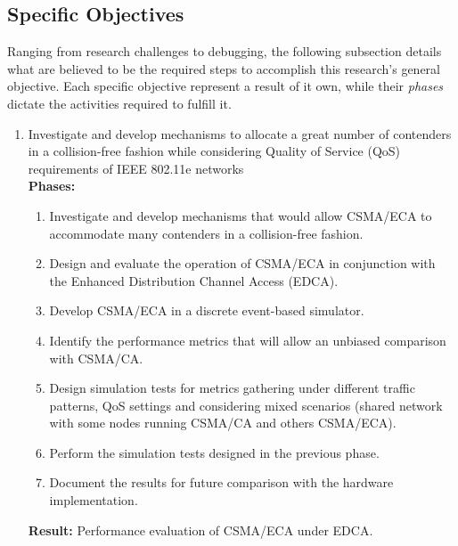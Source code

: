 \subsection{Specific Objectives}
Ranging from research challenges to debugging, the following subsection details what are believed to be the required steps to accomplish this research's general objective. Each specific objective represent a result of it own, while their \emph{phases} dictate the activities required to fulfill it.
\begin{enumerate}

	\item Investigate and develop mechanisms to allocate a great number of contenders in a collision-free fashion while considering Quality of Service (QoS) requirements of IEEE 802.11e networks\\
	
	{\bfseries Phases:}
	\begin{enumerate}
		\item Investigate and develop mechanisms that would allow CSMA/ECA to accommodate many contenders in a collision-free fashion.\label{ECAHysteresis}
		\item Design and evaluate the operation of CSMA/ECA in conjunction with the Enhanced Distribution Channel Access (EDCA).
		\item Develop CSMA/ECA in a discrete event-based simulator.\label{incorporateECA}
		\item Identify the performance metrics that will allow an unbiased comparison with CSMA/CA.\label{metrics}
		\item Design simulation tests for metrics gathering under different traffic patterns, QoS settings and considering mixed scenarios (shared network with some nodes running CSMA/CA and others CSMA/ECA).\label{scenarios}
		\item Perform the simulation tests designed in the previous phase.
		\item Document the results for future comparison with the hardware implementation.\label{simulationResults}\\
	\end{enumerate}
	{\bfseries Result:} Performance evaluation of CSMA/ECA under EDCA.\\



\end{enumerate}
